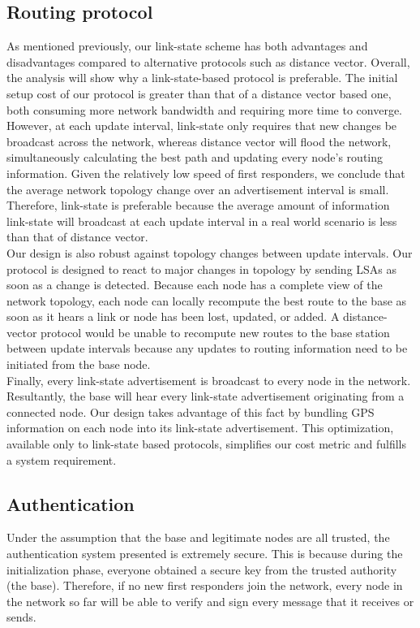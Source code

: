 \documentclass[letterpaper]{article}
\begin{document}
\subsection{Routing protocol}

As mentioned previously, our link-state scheme has both advantages and disadvantages compared to alternative protocols
such as distance vector. Overall, the analysis will show why a link-state-based protocol is preferable. The initial
setup cost of our protocol is greater than that of a distance vector based one, both consuming more network bandwidth
and requiring more time to converge. However, at each update interval, link-state only requires that new changes
be broadcast across the network, whereas distance vector will flood the network, simultaneously calculating the 
best path and updating every node's routing information. Given the relatively low speed of first responders, we 
conclude that the average network topology change over an advertisement interval is small. Therefore, link-state is
preferable because the average amount of information link-state will broadcast at each update interval in a real world
scenario is less than that of distance vector.
\\

\noindent Our design is also robust against topology changes between update intervals. Our protocol is designed to react
to major changes in topology by sending LSAs as soon as a change is detected. Because each node has a complete view of 
the network topology, each node can locally recompute the best route to the base as soon as it hears a link or node has 
been lost, updated, or added. A distance-vector protocol would be unable to recompute new routes to the base station
between update intervals because any updates to routing information need to be initiated from the base node.
\\

\noindent Finally, every link-state advertisement is broadcast to every node in the network. Resultantly, the base
will hear every link-state advertisement originating from a connected node. Our design takes advantage of this fact by
bundling GPS information on each node into its link-state advertisement. This optimization, available only to link-state
based protocols, simplifies our cost metric and fulfills a system requirement. 

\subsection{Authentication}
Under the assumption that the base and legitimate nodes are all trusted, the authentication system presented is extremely secure. This is because during the initialization phase, everyone obtained a secure key from the trusted authority (the base). Therefore, if no new first responders join the network, every node in the network so far will be able to verify and sign every message that it receives or sends. \\
\end{document}
